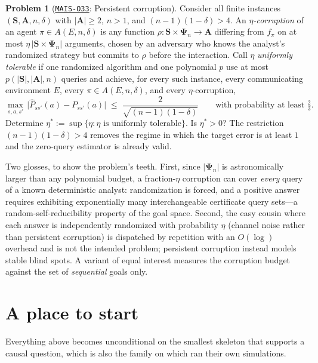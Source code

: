 \documentclass[11pt]{amsart}
\newcommand{\Oid}[1]{\href{https://github.com/lionellevine/MAIS/blob/main/open-problems/MAIS-O#1.md}{\texttt{MAIS-O#1}}}
\theoremstyle{plain}
\theoremstyle{definition}
\newtheorem{problem}[theorem]{Problem}
\newcommand{\bS}{\mathbf{S}}
\newcommand{\bA}{\mathbf{A}}
\newcommand{\bPsi}{\boldsymbol{\Psi}}
\begin{document}
\begin{problem}[\Oid{33}: Persistent corruption]\label{prob:corruption}
Consider all finite instances $(\bS,\bA,n,\delta)$ with $|\bA|\ge2$, $n>1$, and $(n-1)(1-\delta)>4$. An \emph{$\eta$-corruption} of an agent $\pi\in A(E,n,\delta)$ is any function $\rho\colon\bS\times\bPsi_n\to\bA$ differing from $f_\pi$ on at most $\eta\,|\bS\times\bPsi_n|$ arguments, chosen by an adversary who knows the analyst's randomized strategy but commits to $\rho$ before the interaction. Call $\eta$ \emph{uniformly tolerable} if one randomized algorithm and one polynomial $p$ use at most $p(|\bS|,|\bA|,n)$ queries and achieve, for every such instance, every communicating environment $E$, every $\pi\in A(E,n,\delta)$, and every $\eta$-corruption,
\[
   \max_{s,a,s'}\,\bigl|\widehat P_{ss'}(a)-P_{ss'}(a)\bigr|\;\le\; \frac{2}{\sqrt{(n-1)(1-\delta)}}
   \qquad\text{with probability at least } \tfrac23.
\]
Determine $\eta^*:=\sup\{\eta:\eta\text{ is uniformly tolerable}\}$. Is $\eta^*>0$? The restriction $(n-1)(1-\delta)>4$ removes the regime in which the target error is at least $1$ and the zero-query estimator is already valid.
\end{problem}

Two glosses, to show the problem's teeth. First, since $|\bPsi_n|$ is astronomically larger than any polynomial budget, a fraction-$\eta$ corruption can cover \emph{every} query of a known deterministic analyst: randomization is forced, and a positive answer requires exhibiting exponentially many interchangeable certificate query sets---a random-self-reducibility property of the goal space. Second, the easy cousin where each answer is independently randomized with probability $\eta$ (channel noise rather than persistent corruption) is dispatched by repetition with an $O(\log)$ overhead and is not the intended problem; persistent corruption instead models stable blind spots. A variant of equal interest measures the corruption budget against the set of \emph{sequential} goals only.

\section{A place to start}\label{sec:starter}

Everything above becomes unconditional on the smallest skeleton that supports a causal question, which is also the family on which \cite{richens2024} ran their own simulations.
\end{document}
